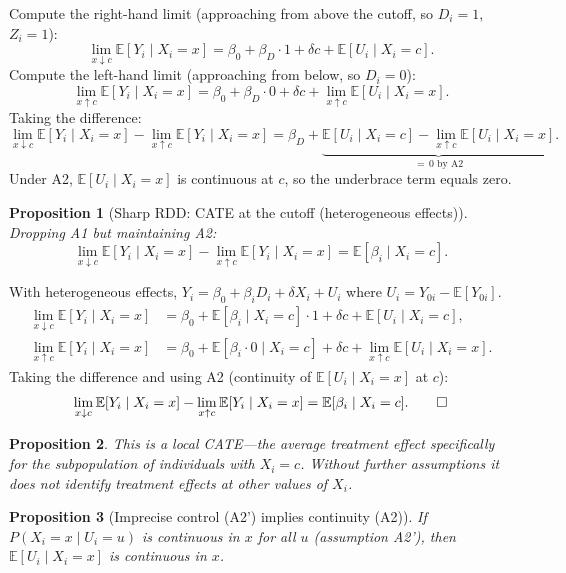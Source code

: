 \documentclass[12pt,a4paper]{article}
\theoremstyle{plain}
\newtheorem{propositio}{Proposition}[section]
\theoremstyle{definition}
\renewenvironment{proof}{\pushQED{\qed}\normalfont}{\popQED\par\nobreak}
\newcommand{\E}{\mathbb{E}}
\begin{document}
\begin{proof}
Compute the right-hand limit (approaching from above the cutoff, so $D_i=1$, $Z_i=1$):
\[
  \lim_{x\downarrow c}\E[Y_i\mid X_i=x]
  = \beta_0 + \beta_D\cdot 1 + \delta c + \E[U_i\mid X_i=c].
\]
Compute the left-hand limit (approaching from below, so $D_i=0$):
\[
  \lim_{x\uparrow c}\E[Y_i\mid X_i=x]
  = \beta_0 + \beta_D\cdot 0 + \delta c + \lim_{x\uparrow c}\E[U_i\mid X_i=x].
\]
Taking the difference:
\[
  \lim_{x\downarrow c}\E[Y_i\mid X_i=x] - \lim_{x\uparrow c}\E[Y_i\mid X_i=x]
  = \beta_D + \underbrace{\E[U_i\mid X_i=c] - \lim_{x\uparrow c}\E[U_i\mid X_i=x]}_{=\,0 \text{ by A2}}.
\]
Under A2, $\E[U_i\mid X_i=x]$ is continuous at $c$, so the underbrace term equals zero.
\end{proof}

\begin{propositio}[Sharp RDD: CATE at the cutoff (heterogeneous effects)\label{prop:srdd_heterog}]
Dropping A1 but maintaining A2:
\[
  \lim_{x\downarrow c}\E[Y_i\mid X_i=x] - \lim_{x\uparrow c}\E[Y_i\mid X_i=x]
  = \E[\beta_i\mid X_i=c].
\]
\end{propositio}

\begin{proof}
With heterogeneous effects, $Y_i = \beta_0 + \beta_i D_i + \delta X_i + U_i$ where $U_i = Y_{0i}-\E[Y_{0i}]$.
\begin{align*}
  \lim_{x\downarrow c}\E[Y_i\mid X_i=x]
  &= \beta_0 + \E[\beta_i\mid X_i=c]\cdot 1 + \delta c + \E[U_i\mid X_i=c],\\
  \lim_{x\uparrow c}\E[Y_i\mid X_i=x]
  &= \beta_0 + \E[\beta_i\cdot 0\mid X_i=c] + \delta c + \lim_{x\uparrow c}\E[U_i\mid X_i=x].
\end{align*}
Taking the difference and using A2 (continuity of $\E[U_i\mid X_i=x]$ at $c$):
\[
  \lim_{x\downarrow c}\E[Y_i\mid X_i=x] - \lim_{x\uparrow c}\E[Y_i\mid X_i=x]
  = \E[\beta_i\mid X_i=c]. \qedhere
\]
\end{proof}

\begin{propositio}
  This is a \emph{local} CATE—the average treatment effect specifically for the subpopulation of individuals with $X_i=c$.  Without further assumptions it does not identify treatment effects at other values of $X_i$.
\end{propositio}

\begin{propositio}[Imprecise control (A2') implies continuity (A2)\label{prop:imprecise_control}]
If $P(X_i=x\mid U_i=u)$ is continuous in $x$ for all $u$ (assumption A2'), then $\E[U_i\mid X_i=x]$ is continuous in $x$.
\end{propositio}
\end{document}
